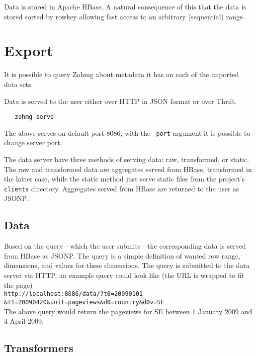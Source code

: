 \documentclass[a4paper,10pt]{book}
\begin{document}
Data is stored in Apache HBase. A natural consequence of this that the
data is stored sorted by rowkey allowing fast access to an arbitrary
(sequential) range.



\section{Export}

It is possible to query Zohmg about metadata it has on each of the imported
data sets.

Data is served to the user either over HTTP in JSON format or over Thrift.

\begin{verbatim}
   zohmg serve
\end{verbatim}

\noindent The above serves on default port 8086, with the \texttt{--port}
argument it is possible to change server port.

The data server have three methods of serving data: raw, transformed, or
static. The raw and transformed data are aggregates served from HBase,
transformed in the latter case, while the static method just serve static
files from the project's \texttt{clients} directory. Aggregates served from
HBase are returned to the user as JSONP.


\subsection{Data}

Based on the query---which the user submits---the corresponding data is
served from HBase as JSONP. The query is a simple definition of wanted row
range, dimensions, and values for these dimensions. The query is submitted
to the data server via HTTP, an example query could look like (the URL is
wrapped to fit the page) \\

\texttt{http://localhost:8086/data/?t0=20090101 \\
\&t1=20090420\&unit=pageviews\&d0=country\&d0v=SE} \\

The above query would return the pageviews for SE between 1 January 2009
and 4 April 2009.


\subsection{Transformers}
\end{document}
